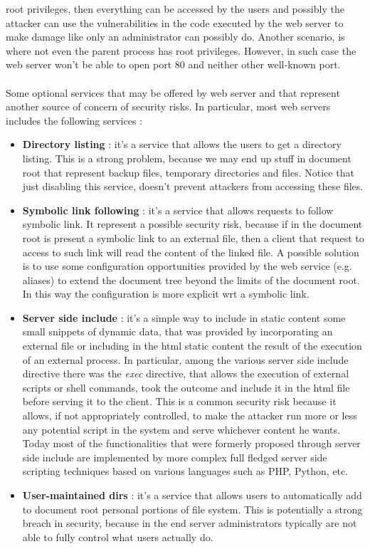 root privileges, then everything can be accessed by the users and possibly the attacker can use the vulnerabilities in the code executed by the web server to make damage like only an administrator can possibly do. Another scenario, is where not even the parent process has root privileges. However, in such case the web server won't be able to open port $80$ and neither other well-known port.\\\\Some optional services that may be offered by web server and that represent another source of concern of security risks. In particular, most web servers includes the following services :
\begin{itemize}
\item \textbf{Directory listing} : it's a service that allows the users to get a directory listing. This is a strong problem, because we may end up stuff in document root that represent backup files, temporary directories and files. Notice that just disabling this service, doesn't prevent attackers from accessing these files.
\item \textbf{Symbolic link following} : it's a service that allows requests to follow symbolic link. It represent a possible security risk, because if in the document root is present a symbolic link to an external file, then a client that request to access to such link will read the content of the linked file. A possible solution is to use some configuration opportunities provided by the web service (e.g. aliases) to extend the document tree beyond the limits of the document root. In this way the configuration is more explicit wrt a symbolic link.
\item \textbf{Server side include} : it's a simple way to include in static content some small snippets of dynamic data, that was provided by incorporating an external file or including in the html static content the result of the execution of an external process. In particular, among the various server side include directive there was the \textit{exec} directive, that allows the execution of external scripts or shell commands, took the outcome and include it in the html file before serving it to the client. This is a common security risk because it allows, if not appropriately controlled, to make the attacker run more or less any potential script in the system and serve whichever content he wants. Today most of the functionalities that were formerly proposed through server side include are implemented by more complex full fledged server side scripting techniques based on various languages such as PHP, Python, etc.
\item \textbf{User-maintained dirs} : it's a service that allows users to automatically add to document root personal portions of file system. This is potentially a strong breach in security, because in the end server administrators typically are not able to fully control what users actually do.
\end{itemize}
